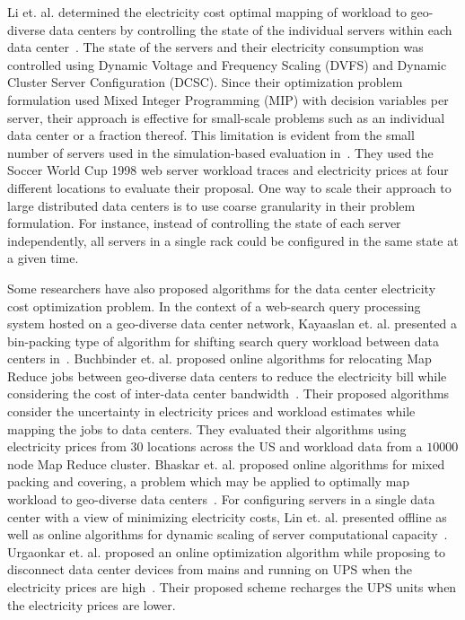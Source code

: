 Li et. al. determined the electricity cost optimal mapping of workload to geo-diverse data centers by controlling the state of the individual servers within each data center~\cite{Li:Optimal:TSG:2012}. The state of the servers and their electricity consumption was controlled using Dynamic Voltage and Frequency Scaling (DVFS) and Dynamic Cluster Server Configuration (DCSC). Since their optimization problem formulation used Mixed Integer Programming (MIP) with decision variables per server, their approach is effective for small-scale problems such as an individual data center or a fraction thereof. This limitation is evident from the small number of servers used in the simulation-based evaluation in~\cite{Li:Optimal:TSG:2012}. They used the Soccer World Cup 1998 web server workload traces and electricity prices at four different locations to evaluate their proposal. One way to scale their approach to large distributed data centers is to use coarse granularity in their problem formulation. For instance, instead of controlling the state of each server independently, all servers in a single rack could be configured in the same state at a given time. 

Some researchers have also proposed algorithms for the data center electricity cost optimization problem. In the context of a web-search query processing system hosted on a geo-diverse data center network, Kayaaslan et. al. presented a bin-packing type of algorithm for shifting search query workload between data centers in~\cite{Kayaaslan:2011:EQP:2009916.2010047}. Buchbinder et. al. proposed online algorithms for relocating Map Reduce jobs between geo-diverse data centers to reduce the electricity bill while considering the cost of inter-data center bandwidth~\cite{Buchbinder:2011:OJR:2008780.2008798}. Their proposed algorithms consider the uncertainty in electricity prices and workload estimates while mapping the jobs to data centers. They evaluated their algorithms using electricity prices from $30$ locations across the US and workload data from a $10000$ node Map Reduce cluster. Bhaskar et. al. proposed online algorithms for mixed packing and covering, a problem which may be applied to optimally map workload to geo-diverse data centers~\cite{Bhaskar:2012:CoRR}. For configuring servers in a single data center with a view of minimizing electricity costs, Lin et. al. presented offline as well as online algorithms for dynamic scaling of server computational capacity~\cite{LinInfocom11}. Urgaonkar et. al. proposed an online optimization algorithm while proposing to disconnect data center devices from mains and running on UPS when the electricity prices are high~\cite{Urgaonkar:2011:OPC:1993744.1993766}. Their proposed scheme recharges the UPS units when the electricity prices are lower.

